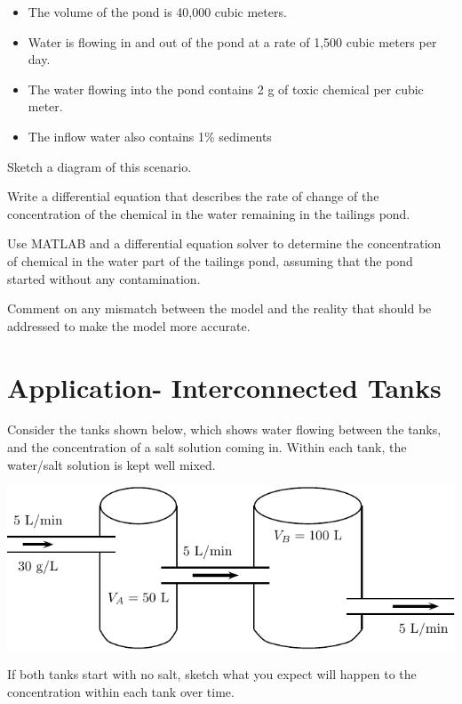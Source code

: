 \begin{itemize}
\item The volume of the pond is 40,000 cubic meters.
\item Water is flowing in and out of the pond at a rate of 1,500 cubic
  meters per day.
\item The water flowing into the pond contains 2 g of toxic chemical
  per cubic meter.
\item The inflow water also contains 1\% sediments
\end{itemize}

\problem Sketch a diagram of this scenario.

\newpage

\problem Write a differential equation that describes the rate of
change of the concentration of the chemical in the water remaining in
the tailings pond.

\newpage

\problem Use MATLAB and a differential equation solver to determine
the concentration of chemical in the water part of the tailings pond,
assuming that the pond started without any contamination.


\newpage

\problem Comment on any mismatch between the model and the reality
that should be addressed to make the model more accurate.

\newpage
{}
\section*{Application- Interconnected Tanks}

\noindent
Consider the tanks shown below, which shows water flowing between the
tanks, and the concentration of a salt solution coming in.  Within
each tank, the water/salt solution is kept well mixed.
\begin{center}
\includegraphics[width=0.7\linewidth]{graphics/notes_09_tanks1}
\end{center}

\begin{problem}
  If both tanks start with no salt, sketch what you expect will happen
  to the concentration within each tank over time.
\end{problem}

